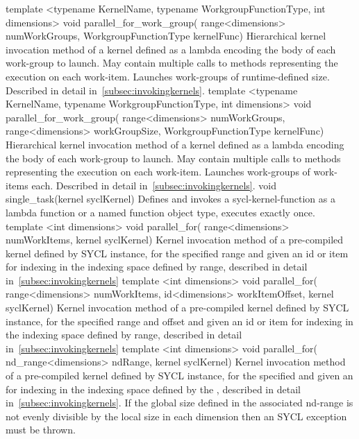   \addRowFourL
    {template <typename KernelName, typename WorkgroupFunctionType, int dimensions>}
    {void parallel_for_work_group(}
    { range<dimensions> numWorkGroups,}
    { WorkgroupFunctionType kernelFunc)}
    {
      Hierarchical kernel invocation method of a kernel defined as a
      lambda encoding the body of each work-group to launch. May
      contain multiple calls to
       methods representing the
      execution on each work-item. Launches
       work-groups of runtime-defined
      size. Described in detail in~\ref{subsec:invokingkernels}.
    }
\addRowFiveL
  {template <typename KernelName, typename WorkgroupFunctionType, int dimensions>}
  {void parallel_for_work_group(}
  { range<dimensions> numWorkGroups,}
  { range<dimensions> workGroupSize,}
  { WorkgroupFunctionType kernelFunc)}
  {
    Hierarchical kernel invocation method of a kernel defined as a
    lambda encoding the body of each work-group to launch. May
    contain multiple calls to
     methods representing the
    execution on each work-item. Launches
     work-groups of
     work-items each. Described in
    detail in~\ref{subsec:invokingkernels}.
  }
  \addRow
    {void single_task(kernel syclKernel)}
    {
      Defines and invokes a \gls{sycl-kernel-function} as a lambda function
      or a named function object type, executes exactly once.
    }
  \addRowThreeL
    { template <int dimensions> void parallel_for(}
    { range<dimensions> numWorkItems,}
    { kernel syclKernel)}
    {
      Kernel invocation method of a pre-compiled \gls{kernel} defined by SYCL
       instance,
      for the specified range and given an id or item for indexing in the
      indexing space defined by range,
      described in detail in~\ref{subsec:invokingkernels}
    }
  \addRowThreeL
    { template <int dimensions> void parallel_for(}
    { range<dimensions> numWorkItems, }
    { id<dimensions> workItemOffset, kernel syclKernel) }
    {
      Kernel invocation method of a pre-compiled \gls{kernel} defined by SYCL
       instance,
      for the specified range and offset and given an id or item for indexing in the
      indexing space defined by range,
      described in detail in~\ref{subsec:invokingkernels}
    }
   \addRowThreeL
    { template <int dimensions> void parallel_for(}
    { nd_range<dimensions> ndRange,}
    { kernel syclKernel)}
    {
      Kernel invocation method of a pre-compiled \gls{kernel} defined by SYCL  instance,
      for the specified  and given an 
      for indexing in the indexing space defined by the ,
      described in detail in~\ref{subsec:invokingkernels}. If the global size defined in the associated
      \gls{nd-range} is not evenly divisible by the local size in each dimension then an 
      SYCL exception must be thrown.
    }
\completeTable

